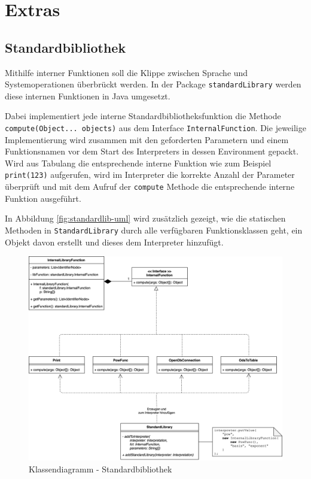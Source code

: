\section{Extras}

\subsection{Standardbibliothek}\label{sectionStandardBibliothek}

Mithilfe interner Funktionen soll die Klippe zwischen Sprache und Systemoperationen überbrückt werden.
In der Package \texttt{standardLibrary} werden diese internen Funktionen in Java umgesetzt.

Dabei implementiert jede interne Standardbibliotheksfunktion die Methode \\
\texttt{compute(Object... objects)} aus dem Interface \texttt{InternalFunction}.
Die jeweilige Implementierung wird zusammen mit den geforderten Parametern und einem Funktionsnamen vor dem Start des Interpreters in dessen Environment gepackt.
Wird aus Tabulang die entsprechende interne Funktion wie zum Beispiel \texttt{print(123)} aufgerufen, wird im Interpreter die korrekte Anzahl der Parameter überprüft und mit dem Aufruf der \texttt{compute} Methode die entsprechende interne Funktion ausgeführt.

In Abbildung \ref{fig:standardlib-uml} wird zusätzlich gezeigt, wie die statischen Methoden in \texttt{StandardLibrary} durch alle verfügbaren Funktionsklassen geht, ein Objekt davon erstellt und dieses dem Interpreter hinzufügt.

\begin{figure}[h]
\centering
\includegraphics[width=.8\textwidth]{images/standardlib-uml.png}
\caption{Klassendiagramm - Standardbibliothek}
\end{figure}\label{fig:standardlib-uml}

